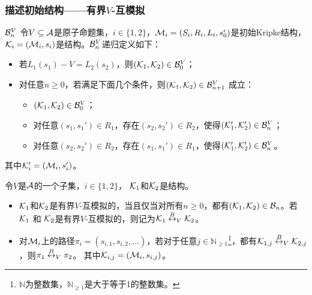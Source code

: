 \documentclass[9pt, CJK]{beamer}
\begin{document}
\begin{frame}
	\frametitle{描述初始结构——{\footnotesize 有界$V$-互模拟}}
	{\footnotesize
		\begin{block}{${\cal B}_n^V$}
			令$V\subseteq {\cal A}$是原子命题集，$i\in \{1,2\}$，${\cal M}_i=(S_i,R_i,L_i,s_0^i)$是初始Kripke结构，${\cal K}_i=({\cal M}_i, s_i)$是结构。${\cal B}_n^V$递归定义如下：
			\begin{itemize}
				\item 若$L_1(s_1)-V=L_2(s_2)$，则$({\cal K}_1,{\cal K}_2) \in {\cal B}_0^V$；
				\item 对任意$n\ge 0$，若满足下面几个条件，则$({\cal K}_1,{\cal K}_2)\in {\cal B}_{n+1}^V$ 成立：
				\begin{itemize}
					\item $({\cal K}_1,{\cal K}_2) \in {\cal B}_0^V$；
					\item 对任意$(s_1,s_1')\in R_1$，存在$(s_2,s_2')\in R_2$，使得$({\cal K}_1',{\cal K}_2') \in {\cal B}_n^V$；
					\item 对任意$(s_2,s_2')\in R_2$，存在$(s_1,s_1')\in R_1$，使得$({\cal K}_1',{\cal K}_2') \in {\cal B}_n^V$。
				\end{itemize}
			\end{itemize}
			其中${\cal K}_i'=({\cal M}_i,s_i')$。
		\end{block}
		\begin{definition}[有界$V$-互模拟]\label{def:V-bisimulation}
			令$V$是${\cal A}$的一个子集，$i\in \{1,2\}$， ${\cal K}_1$和${\cal K}_2$是结构。
			\begin{itemize}
				\item ${\cal K}_1$和${\cal K}_2$是有界$V$-互模拟的，当且仅当对所有$n \ge 0$，都有$({\cal K}_1, {\cal K}_2)\in {\cal B}_n$。若 ${\cal K}_1$ 和 ${\cal K}_2$是有界$V$-互模拟的，则记为${\cal K}_1 \overset{B}{\leftrightarrow}_V {\cal K}_2$。
				\item 对${\cal M}_i$上的路径$\pi_i=(s_{i,1},s_{i,2},\dots)$，若对于任意$j\in \mathbb{N}_{\ge 1}$\footnote{$\mathbb{N}$为整数集，$\mathbb{N}_{\ge 1}$是大于等于1的整数集。}，都有${\cal K}_{1,j} \overset{B}{\leftrightarrow}_V {\cal K}_{2,j}$，则$\pi_1 \overset{B}{\leftrightarrow}_V \pi_2$。 其中${\cal K}_{i, j}=({\cal M}_i, s_{i,j})$。
			\end{itemize}
		\end{definition}
	}
\end{frame}
\end{document}
